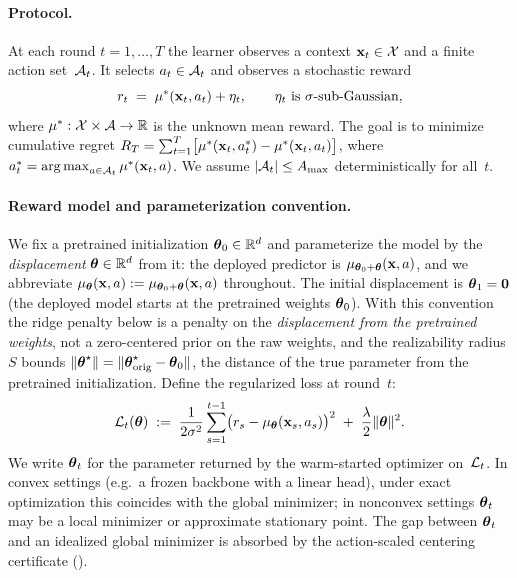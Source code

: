 \documentclass[twoside]{article}
\begin{document}
\paragraph{Protocol.}
At each round $t=1,\dots,T$ the learner observes a context
$\mathbf{x}_t\in\mathcal{X}$ and a finite action set~$\mathcal{A}_t$.  It selects
$a_t\in\mathcal{A}_t$ and observes a stochastic reward
\begin{equation}\label{eq:reward}
  r_t \;=\; \mu^*(\mathbf{x}_t, a_t) + \eta_t, \qquad
  \eta_t \text{ is } \sigma\text{-sub-Gaussian},
\end{equation}
where $\mu^*:\mathcal{X}\times\mathcal{A}\to\mathbb{R}$ is the unknown mean reward.
The goal is to minimize cumulative regret
$R_T = \sum_{t=1}^{T}\bigl[\mu^*(\mathbf{x}_t,a_t^*) - \mu^*(\mathbf{x}_t,a_t)\bigr]$,
where $a_t^* = \operatorname*{arg\,max}_{a\in\mathcal{A}_t}\mu^*(\mathbf{x}_t,a)$.
We assume $|\mathcal{A}_t|\le A_{\max}$ deterministically for all~$t$.

\paragraph{Reward model and parameterization convention.}
We fix a pretrained initialization $\boldsymbol{\theta}_0\in\mathbb{R}^d$ and parameterize the model
by the \emph{displacement} $\boldsymbol{\theta}\in\mathbb{R}^d$ from it: the deployed predictor is
$\mu_{\boldsymbol{\theta}_0+\boldsymbol{\theta}}(\mathbf{x},a)$, and we abbreviate
$\mu_{\boldsymbol{\theta}}(\mathbf{x},a):=\mu_{\boldsymbol{\theta}_0+\boldsymbol{\theta}}(\mathbf{x},a)$ throughout.  The initial
displacement is $\boldsymbol{\theta}_1=\mathbf 0$ (the deployed model starts at the pretrained
weights $\boldsymbol{\theta}_0$).  With this convention the ridge penalty below is a penalty
on the \emph{displacement from the pretrained weights}, not a zero-centered prior
on the raw weights, and the realizability radius $S$ bounds
$\|\boldsymbol{\theta}^\star\|=\|\boldsymbol{\theta}^\star_{\mathrm{orig}}-\boldsymbol{\theta}_0\|$, the distance of
the true parameter from the pretrained initialization.
Define the regularized loss at round~$t$:
\begin{equation}\label{eq:erm}
  \mathcal{L}_t(\boldsymbol{\theta})
  \;:=\;
    \frac{1}{2\sigma^2}\sum_{s=1}^{t-1}
      \bigl(r_s - \mu_{\boldsymbol{\theta}}(\mathbf{x}_s,a_s)\bigr)^2
    \;+\; \frac{\lambda}{2}\|\boldsymbol{\theta}\|^2 .
\end{equation}
We write $\boldsymbol{\theta}_t$ for the parameter returned by the warm-started
optimizer on~$\mathcal{L}_t$.
In convex settings (e.g.\ a frozen backbone with a linear head), under exact
optimization this coincides with the global minimizer; in nonconvex settings $\boldsymbol{\theta}_t$
may be a local minimizer or approximate stationary point.
The gap between $\boldsymbol{\theta}_t$ and an idealized global minimizer is absorbed
by the action-scaled centering certificate ().
\end{document}
